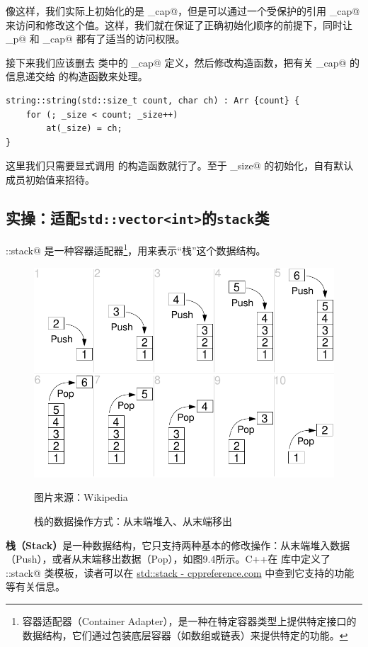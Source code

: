 像这样，我们实际上初始化的是 \lstinline@ori_cap@，但是可以通过一个受保护的引用 \lstinline@_cap@ 来访问和修改这个值。这样，我们就在保证了正确初始化顺序的前提下，同时让 \lstinline@_p@ 和 \lstinline@_cap@ 都有了适当的访问权限。\par
接下来我们应该删去 \lstinline@string@ 类中的 \lstinline@_cap@ 定义，然后修改构造函数，把有关 \lstinline@_cap@ 的信息递交给 \lstinline@Arr@ 的构造函数来处理。
\begin{lstlisting}
string::string(std::size_t count, char ch) : Arr {count} {
    for (; _size < count; _size++)
        at(_size) = ch;
}
\end{lstlisting}
这里我们只需要显式调用 \lstinline@Arr@ 的构造函数就行了。至于 \lstinline@_size@ 的初始化，自有默认成员初始值来招待。\par
\subsection*{实操：适配\texttt{std::vector<int>}的\texttt{stack}类}
\lstinline@std::stack@ 是一种容器适配器\footnote{容器适配器（Container Adapter），是一种在特定容器类型上提供特定接口的数据结构，它们通过包装底层容器（如数组或链表）来提供特定的功能。}，用来表示``栈''这个数据结构。\par
\begin{figure}[htbp]
    \centering
    \includegraphics[width=.75\textwidth]{../images/generalized_parts/09_lifo_stack.png}
    \caption{栈的数据操作方式：从末端堆入、从末端移出}
    \footnotesize{图片来源：Wikipedia}
\end{figure}
\textbf{栈（Stack）}是一种数据结构，它只支持两种基本的修改操作：从末端堆入数据（Push），或者从末端移出数据（Pop），如图9.4所示。C++在 \lstinline@stack@ 库中定义了 \lstinline@std::stack@ 类模板，读者可以在 \href{https://en.cppreference.com/w/cpp/container/stack}{std::stack - cppreference.com} 中查到它支持的功能等有关信息。
